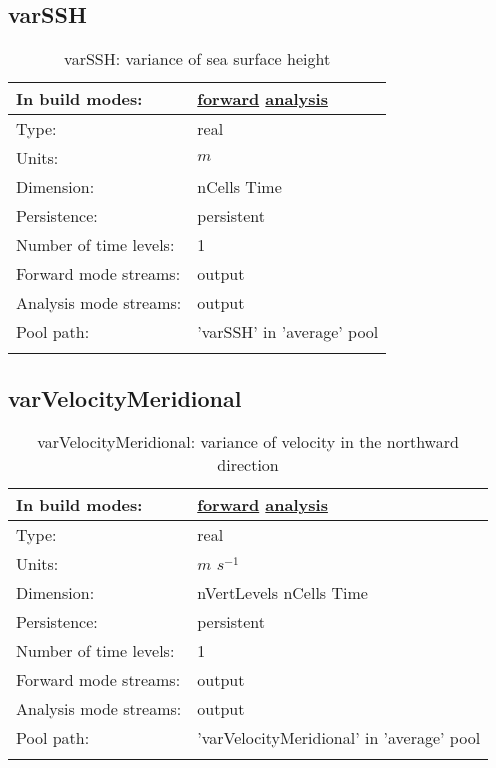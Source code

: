 \subsection[varSSH]{varSSH}
\label{subsec:var_sec_average_varSSH}
\begin{center}
\begin{longtable}{| p{2.0in} | p{4.0in} |}
        \hline 
        In build modes: & \hyperref[subsec:forward_var_tab_average]{forward} \hyperref[subsec:analysis_var_tab_average]{analysis} \\
        \hline 
        Type: & real \\
        \hline 
        Units: & $m$ \\
        \hline 
        Dimension: & nCells Time \\
        \hline 
        Persistence: & persistent \\
        \hline 
        Number of time levels: & 1 \\
        \hline 
		 Forward mode streams: &  output \\
        \hline 
		 Analysis mode streams: &  output \\
        \hline 
            Pool path: & 'varSSH' in 'average' pool
 \\
		 \hline 
    \caption{varSSH: variance of sea surface height}
\end{longtable}
\end{center}
\subsection[varVelocityMeridional]{varVelocityMeridional}
\label{subsec:var_sec_average_varVelocityMeridional}
\begin{center}
\begin{longtable}{| p{2.0in} | p{4.0in} |}
        \hline 
        In build modes: & \hyperref[subsec:forward_var_tab_average]{forward} \hyperref[subsec:analysis_var_tab_average]{analysis} \\
        \hline 
        Type: & real \\
        \hline 
        Units: & $m$ $s^{-1}$ \\
        \hline 
        Dimension: & nVertLevels nCells Time \\
        \hline 
        Persistence: & persistent \\
        \hline 
        Number of time levels: & 1 \\
        \hline 
		 Forward mode streams: &  output \\
        \hline 
		 Analysis mode streams: &  output \\
        \hline 
            Pool path: & 'varVelocityMeridional' in 'average' pool
 \\
		 \hline 
    \caption{varVelocityMeridional: variance of velocity in the northward direction}
\end{longtable}
\end{center}

